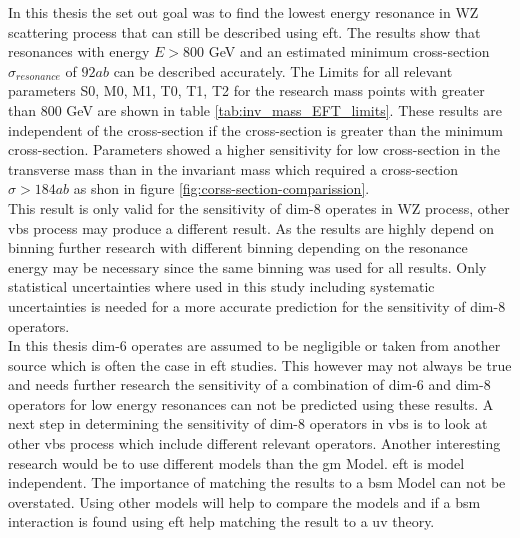 \documentclass[../Bachelorarbeit.tex]{subfiles}
\begin{document}
\label{sec:summery}
In this thesis the set out goal was to find the lowest energy resonance in WZ scattering process that can still be described using \acrshort{eft}.
The results show that resonances with energy $E>800$ GeV and an estimated minimum cross-section $\sigma_{resonance}$ of $92 ab$ can be described accurately.
The Limits for all relevant parameters S0, M0, M1, T0, T1, T2 for the research mass points with greater than 800 GeV are shown in table \ref{tab:inv_mass_EFT_limits}.
These results are independent of the cross-section if the cross-section is greater than the minimum cross-section. Parameters showed a higher sensitivity for low cross-section
in the transverse mass than in the invariant mass which required a cross-section $\sigma>184 ab$ as shon in figure \ref{fig:corss-section-comparission}.\\
This result is only valid for the sensitivity of dim-8 operates in WZ process, other \acrshort{vbs} process may produce a different result.
As the results are highly depend on binning further research with different binning depending on the resonance energy may be necessary since the same binning was used for all results.
Only statistical uncertainties where used in this study including systematic uncertainties is needed for a more accurate prediction for the sensitivity of dim-8 operators.\\
In this thesis dim-6 operates are assumed to be negligible or taken from another source which is often the case in \acrshort{eft} studies.
This however may not always be true and needs further research the sensitivity of a combination of dim-6 and dim-8 operators for low energy resonances can not be predicted using these results.
A next step in determining the sensitivity of dim-8 operators in \acrshort{vbs} is to look at other \acrshort{vbs} process which include different relevant operators.
Another interesting research would be to use different models than the \acrshort{gm} Model. \acrshort{eft} is model independent. The importance of matching the results to a \acrshort{bsm} Model can not be overstated.
Using other models will help to compare the models and if a \acrshort{bsm} interaction is found using \acrshort{eft} help matching the result to a \acrshort{uv} theory.
\end{document}
